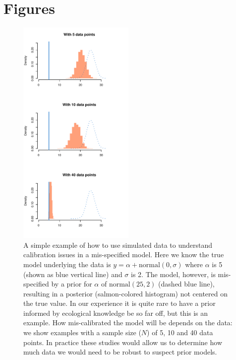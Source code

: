 \documentclass[11pt]{article}
\begin{document}
\section*{Figures}

\begin{figure}[ht]
\centering
\noindent \includegraphics[width=0.5\textwidth]{examples/misspecifiedmodel/priorpostforflows.pdf}
\caption{A simple example of how to use simulated data to understand calibration issues in a mis-specified model. Here we know the true model underlying the data is $y=\alpha + \text{normal}(0, \sigma)$ where $\alpha$ is 5 (shown as blue vertical line) and $\sigma$ is 2. The model, however, is mis-specified by a prior for $\alpha$ of $\text{normal}(25, 2)$ (dashed blue line), resulting in a posterior (salmon-colored histogram) not centered on the true value. In our experience it is quite rare to have a prior informed by ecological knowledge be so far off, but this is an example. How mis-calibrated the model will be depends on the data: we show examples with a sample size ($N$) of 5, 10 and 40 data points. In practice these studies would allow us to determine how much data we would need to be robust to suspect prior models. }
\label{fig:misspecifyprior}
\end{figure}
\end{document}
